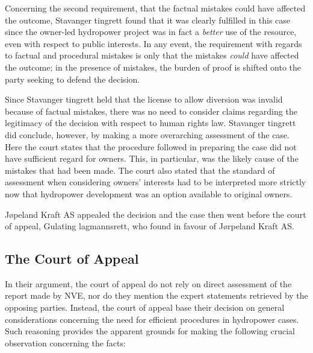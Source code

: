 Concerning the second requirement, that the factual mistakes could have affected the outcome, Stavanger tingrett found that it was clearly fulfilled in this case since the owner-led hydropower project was in fact a \emph{better} use of the resource, even with respect to public interests. In any event, the requirement with regards to factual and procedural mistakes is only that the mistakes \emph{could} have affected the outcome; in the presence of mistakes, the burden of proof is shifted onto the party seeking to defend the decision.

Since Stavanger tingrett held that the license to allow diversion was invalid because of factual mistakes, there was no need to consider claims regarding the legitimacy of the decision with respect to human rights law. Stavanger tingrett did conclude, however, by making a more overarching assessment of the case. Here the court states that the procedure followed in preparing the case did not have sufficient regard for owners. This, in particular, was the likely cause of the mistakes that had been made. The court also stated that the standard of assessment when considering owners' interests had to be interpreted more strictly now that hydropower development was an option available to original owners.


Jøpeland Kraft AS appealed the decision and the case then went before the court of appeal, Gulating lagmannsrett, who found in favour of Jørpeland Kraft AS. 

\subsection{The Court of Appeal}

In their argument, the court of appeal do not rely on direct assessment of the report made by NVE, nor do they mention the expert statements retrieved by the opposing parties. Instead, the court of appeal base their decision on general considerations concerning the need for efficient procedures in hydropower cases. Such reasoning provides the apparent grounds for making the following crucial observation concerning the facts:

